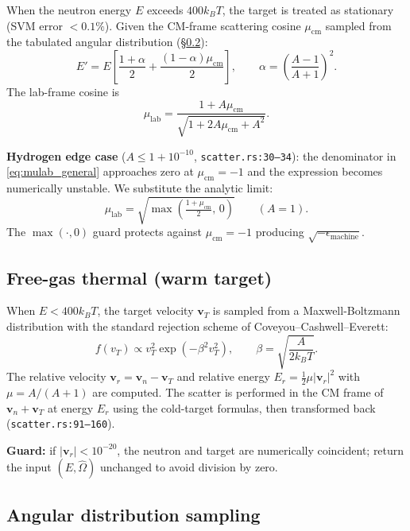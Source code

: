 \documentclass[11pt,a4paper]{article}
\begin{document}
When the neutron energy $E$ exceeds $400 k_B T$, the target is
treated as stationary (SVM error $< 0.1\%$). Given the CM-frame
scattering cosine $\mu_\text{cm}$ sampled from the tabulated
angular distribution (\S\ref{sec:angle}):
\begin{equation}
E' = E\left[\frac{1 + \alpha}{2} +
\frac{(1 - \alpha)\mu_\text{cm}}{2}\right],
\qquad
\alpha = \left(\frac{A - 1}{A + 1}\right)^2.
\end{equation}
The lab-frame cosine is
\begin{equation}
\mu_\text{lab} = \frac{1 + A \mu_\text{cm}}
{\sqrt{1 + 2 A \mu_\text{cm} + A^2}}.
\label{eq:mulab_general}
\end{equation}

\textbf{Hydrogen edge case} ($A \leq 1 + 10^{-10}$,
\texttt{scatter.rs:30--34}): the denominator in
\eqref{eq:mulab_general} approaches zero at $\mu_\text{cm} = -1$
and the expression becomes numerically unstable. We substitute
the analytic limit:
\begin{equation}
\mu_\text{lab} = \sqrt{\max\!\left(\tfrac{1 + \mu_\text{cm}}{2},\, 0\right)}
\qquad (A = 1).
\end{equation}
The $\max(\cdot,0)$ guard protects against $\mu_\text{cm} = -1$
producing $\sqrt{-\epsilon_\text{machine}}$.

\subsection{Free-gas thermal (warm target)}

When $E < 400 k_B T$, the target velocity $\mathbf{v}_T$ is sampled
from a Maxwell-Boltzmann distribution with the standard rejection
scheme of Coveyou--Cashwell--Everett:
\begin{equation}
f(v_T) \propto v_T^2 \exp(-\beta^2 v_T^2), \qquad
\beta = \sqrt{\frac{A}{2 k_B T}}.
\end{equation}
The relative velocity $\mathbf{v}_r = \mathbf{v}_n - \mathbf{v}_T$
and relative energy
$E_r = \tfrac{1}{2}\mu|\mathbf{v}_r|^2$ with
$\mu = A/(A+1)$ are computed. The scatter is performed in the CM
frame of $\mathbf{v}_n + \mathbf{v}_T$ at energy $E_r$ using the
cold-target formulas, then transformed back (\texttt{scatter.rs:91--160}).

\textbf{Guard:} if $|\mathbf{v}_r| < 10^{-20}$, the neutron and
target are numerically coincident; return the input $(E, \hat{\Omega})$
unchanged to avoid division by zero.

\subsection{Angular distribution sampling}
\label{sec:angle}
\end{document}
